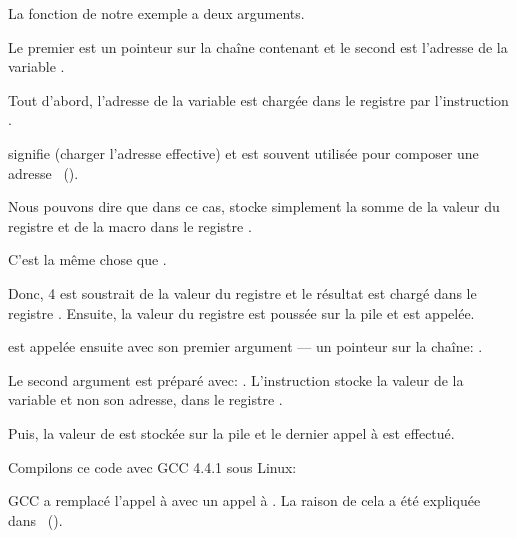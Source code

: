 La fonction \scanf de notre exemple a deux arguments.

Le premier est un pointeur sur la chaîne contenant  et le second est l'adresse
de la variable .

Tout d'abord, l'adresse de la variable  est chargée dans le registre \EAX
par l'instruction \\ .

\LEA signifie  (charger l'adresse effective) et est souvent
utilisée pour composer une adresse ~().

Nous pouvons dire que dans ce cas, \LEA stocke simplement la somme de la valeur du
registre \EBP et de la macro  dans le registre \EAX.

C'est la même chose que .

Donc, 4 est soustrait de la valeur du registre \EBP et le résultat est chargé dans
le registre \EAX.
Ensuite, la valeur du registre \EAX est poussée sur la pile et \scanf est appelée.

\printf est appelée ensuite avec son premier argument --- un pointeur sur la chaîne:
.

Le second argument est préparé avec: .
L'instruction stocke la valeur de la variable  et non son adresse, dans le
registre \ECX.

Puis, la valeur de \ECX est stockée sur la pile et le dernier appel à \printf
est effectué.




Compilons ce code avec GCC 4.4.1 sous Linux:



GCC a remplacé l'appel à \printf avec un appel à \puts. La raison de cela a été
expliquée dans ~().

% 

